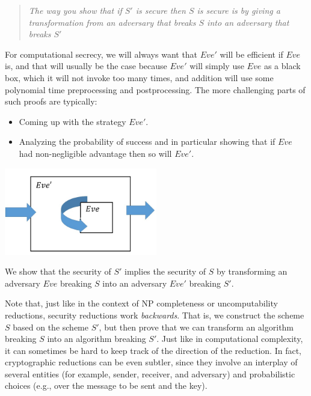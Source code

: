 \begin{quote}
\emph{The way you show that if \(S'\) is secure then \(S\) is secure is
by giving a transformation from an adversary that breaks \(S\) into an
adversary that breaks \(S'\)}
\end{quote}

For computational secrecy, we will always want that \(Eve'\) will be
efficient if \(Eve\) is, and that will usually be the case because
\(Eve'\) will simply use \(Eve\) as a black box, which it will not
invoke too many times, and addition will use some polynomial time
preprocessing and postprocessing. The more challenging parts of such
proofs are typically:

\begin{itemize}
\item
  Coming up with the strategy \(Eve'\).
\item
  Analyzing the probability of success and in particular showing that if
  \(Eve\) had non-negligible advantage then so will \(Eve'\).
\end{itemize}

\begin{marginfigure}
\centering
\includegraphics[width=\linewidth, height=1.5in, keepaspectratio]{../figure/reduction.jpg}
\caption{We show that the security of \(S'\) implies the security of
\(S\) by transforming an adversary \(Eve\) breaking \(S\) into an
adversary \(Eve'\) breaking \(S'\).}
\label{reductiongenfig}
\end{marginfigure}

Note that, just like in the context of NP completeness or
uncomputability reductions, security reductions work \emph{backwards}.
That is, we construct the scheme \(S\) based on the scheme \(S'\), but
then prove that we can transform an algorithm breaking \(S\) into an
algorithm breaking \(S'\). Just like in computational complexity, it can
sometimes be hard to keep track of the direction of the reduction. In
fact, cryptographic reductions can be even subtler, since they involve
an interplay of several entities (for example, sender, receiver, and
adversary) and probabilistic choices (e.g., over the message to be sent
and the key).

